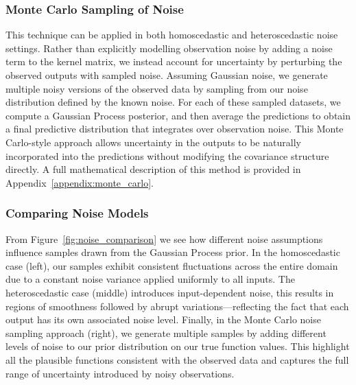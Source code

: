 \documentclass[10pt]{article}
\begin{document}
\subsubsection*{Monte Carlo Sampling of Noise}  

This technique can be applied in both homoscedastic and heteroscedastic noise settings. Rather than explicitly modelling observation noise by adding a noise term to the kernel matrix, we instead account for uncertainty by perturbing the observed outputs with sampled noise.
Assuming Gaussian noise, we generate multiple noisy versions of the observed data by sampling from our noise distribution defined by the known noise. For each of these sampled datasets, we compute a Gaussian Process posterior, and then average the predictions to obtain a final predictive distribution that integrates over observation noise.
This Monte Carlo-style approach allows uncertainty in the outputs to be naturally incorporated into the predictions without modifying the covariance structure directly. A full mathematical description of this method is provided in Appendix~\ref{appendix:monte_carlo}.

%
%
\subsubsection*{Comparing Noise Models}
From Figure~\ref{fig:noise_comparison} we see how different noise assumptions influence samples drawn from the Gaussian Process prior. 
In the homoscedastic case (left), our samples exhibit consistent fluctuations across the entire domain due to a constant noise variance applied uniformly to all inputs. 
The heteroscedastic case (middle) introduces input-dependent noise, this results in regions of smoothness followed by abrupt variations—reflecting the fact that each output has its own associated noise level.
Finally, in the Monte Carlo noise sampling approach (right), we generate multiple samples by adding different levels of noise to our prior distribution on our true function values.
This highlight all the plausible functions consistent with the observed data and captures the full range of uncertainty introduced by noisy observations.
\end{document}
